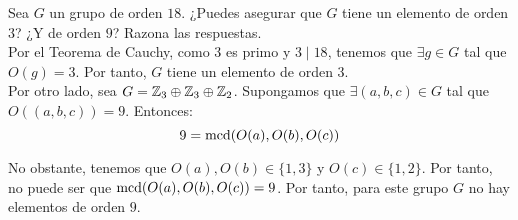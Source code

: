 \documentclass[12pt]{article}
\begin{document}
    \begin{ejercicio}
        Sea $G$ un grupo de orden $18$. ¿Puedes asegurar que $G$ tiene un elemento de orden $3$? ¿Y de orden $9$? Razona las respuestas.\\


        Por el Teorema de Cauchy, como $3$ es primo y $3\mid 18$, tenemos que $\exists g\in G$ tal que $O(g)=3$. Por tanto, $G$ tiene un elemento de orden $3$.\\

        Por otro lado, sea $G=\mathbb{Z}_3 \oplus \mathbb{Z}_3 \oplus \mathbb{Z}_2$. Supongamos que $\exists (a,b,c)\in G$ tal que $O((a,b,c))=9$. Entonces:
        \begin{equation*}
            9 = \operatorname{mcd}(O(a), O(b), O(c))
        \end{equation*}

        No obstante, tenemos que $O(a), O(b)\in \{1,3\}$ y $O(c)\in \{1,2\}$. Por tanto, no puede ser que $\operatorname{mcd}(O(a), O(b), O(c))=9$. Por tanto, para este grupo $G$ no hay elementos de orden $9$.
    \end{ejercicio}
\end{document}
